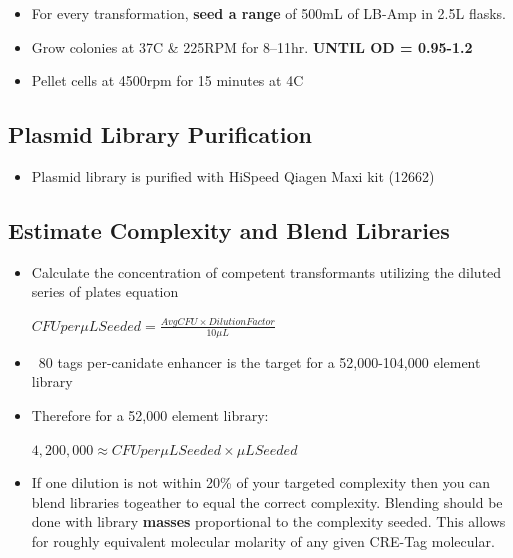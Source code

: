 \documentclass[a4paper]{article}
\begin{document}
\begin{itemize}
            \item For every transformation, \textbf{seed a range} of 500mL of LB-Amp in 2.5L flasks.  
            
            \item Grow colonies at 37C \& 225RPM for 8–11hr. \textbf{UNTIL OD = 0.95-1.2}
            
            \item Pellet cells at 4500rpm for 15 minutes at 4C
            
        \end{itemize}
    
    \subsection{Plasmid Library Purification} 
    	\begin{itemize}
                	
            \item Plasmid library is purified with HiSpeed Qiagen Maxi kit (12662)
        
    	\end{itemize}    
     
     \subsection{Estimate Complexity and Blend Libraries}
     	\begin{itemize}
     		\item Calculate the concentration of competent transformants utilizing the diluted series of plates equation 
 
			 	\begin{center}
        			$CFU per\mu L  Seeded = \frac{ AvgCFU \times Dilution Factor} {10 \mu L}$
				\end{center}
            
            \item ~80 tags per-canidate enhancer is the target for a 52,000-104,000 element library
            
            \item Therefore for a 52,000 element library:
            	\begin{center}
        			$4,200,000 \approx CFU per\mu L Seeded \times \mu L Seeded$
				\end{center}
            
            \item If one dilution is not within 20\% of your targeted complexity then you can blend libraries togeather to equal the correct complexity. Blending should be done with library \textbf{masses} proportional to the complexity seeded. This allows for roughly equivalent molecular molarity of any given CRE-Tag molecular.
            
		\end{itemize}
     
\end{document}
